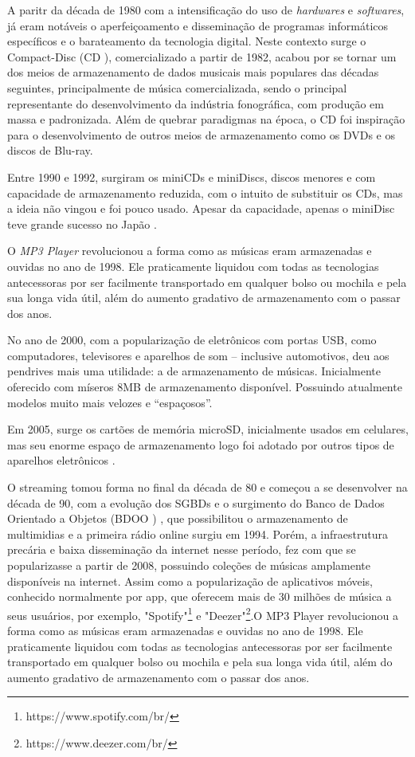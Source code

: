 A paritr da década de 1980 com a intensificação do uso de \textit{hardwares} e \textit{softwares}, já eram notáveis o aperfeiçoamento e disseminação de programas informáticos específicos e o barateamento da tecnologia digital. Neste contexto surge o Compact-Disc (CD ), comercializado a partir de 1982, acabou por se tornar um dos meios de armazenamento de dados musicais mais populares das décadas seguintes, principalmente de música comercializada, sendo o principal representante do desenvolvimento da indústria fonográfica, com produção em massa e padronizada. Além de quebrar paradigmas na época, o CD foi inspiração para o desenvolvimento de outros meios de armazenamento como os DVDs e os discos de Blu-ray.

Entre 1990 e 1992, surgiram os miniCDs e miniDiscs, discos menores e com capacidade de armazenamento reduzida, com o intuito de substituir os CDs, mas a ideia não vingou e foi pouco usado. Apesar da capacidade, apenas o miniDisc teve grande sucesso no Japão \cite{marchi2005}.

O \textit{MP3 Player} revolucionou a forma como as músicas eram armazenadas e ouvidas no ano de 1998. Ele praticamente liquidou com todas as tecnologias antecessoras por ser facilmente transportado em qualquer bolso ou mochila e pela sua longa vida útil, além do aumento gradativo de armazenamento com o passar dos anos.

No ano de 2000, com a popularização de eletrônicos com portas USB, como computadores, televisores e aparelhos de som – inclusive automotivos, deu aos pendrives mais uma utilidade: a de armazenamento de músicas. Inicialmente oferecido com míseros 8MB de armazenamento disponível. Possuindo atualmente modelos muito mais velozes e “espaçosos”.

Em 2005, surge os cartões de memória microSD, inicialmente usados em celulares, mas seu enorme espaço de armazenamento logo foi adotado por outros tipos de aparelhos eletrônicos \cite{marchi2005}.

O streaming tomou forma no final da década de 80 e começou a se desenvolver na década de 90, com a evolução dos SGBDs  e o surgimento do Banco de Dados Orientado a Objetos (BDOO ) \cite{junior&segundo2008}, que possibilitou o armazenamento de multimidias e a primeira rádio online surgiu em 1994. Porém, a infraestrutura precária e baixa disseminação da internet nesse período, fez com que se popularizasse a partir de 2008, possuindo coleções de músicas amplamente disponíveis na internet. Assim como a popularização de aplicativos móveis, conhecido normalmente por app, que oferecem mais de 30 milhões de música a seus usuários, por exemplo, "Spotify"\footnote{https://www.spotify.com/br/} e "Deezer"\footnote{https://www.deezer.com/br/}.O MP3 Player revolucionou a forma como as músicas eram armazenadas e ouvidas no ano de 1998. Ele praticamente liquidou com todas as tecnologias antecessoras por ser facilmente transportado em qualquer bolso ou mochila e pela sua longa vida útil, além do aumento gradativo de armazenamento com o passar dos anos.

